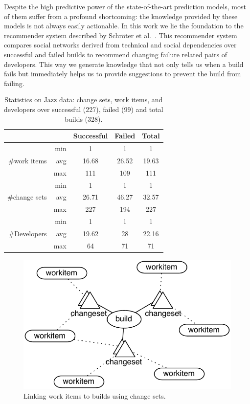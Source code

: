 Despite the high predictive power of the state-of-the-art prediction models, most
of them suffer from a profound shortcoming: the knowledge provided by these
models is not always easily actionable. In this work we lie the foundation to
the recommender system described by Schr\"oter et
al.~\cite{schroeter:rsse:2008}. 
%
This recommender system compares social networks derived from technical and social dependencies over successful and failed builds to recommend changing failure related pairs of developers.
%
%
This way we generate knowledge that not only tells us when a build fails but immediately helps us to provide suggestions to prevent the build from failing.








\begin{table}[t]
\centering
\begin{tabular}{rrccc}
\toprule
& & Successful & Failed & Total\\
\midrule
&min &1&1&1\\
\#work items & avg  & 16.68&26.52&19.63\\
& max & 111&109&111\\
\midrule
& min & 1&1&1\\
\#change sets & avg  & 26.71&46.27&32.57\\
& max & 227&194&227\\
\midrule
& min & 1&1&1\\
\#Developers & avg  & 19.62&28&22.16\\
& max &64&71&71\\
\bottomrule
\end{tabular}
\caption{Statistics on Jazz data: change sets, work items, 
and developers over successful (227), failed (99) and total builds (328).}
\label{tab:jazzbuildinfo}
\end{table}

\begin{figure}[t]
\centering
\includegraphics[width=.7\columnwidth]{figures/buildworkitem}
\caption{Linking work items to builds using change sets.}
\label{fig:buildtowork item}
\end{figure}


